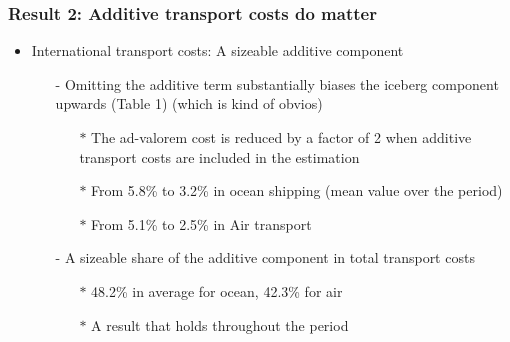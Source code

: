 \documentclass[10 pt,Helvetica, french]{beamer}
\begin{document}
\begin{frame}[label=slide_result2]
\frametitle{Result 2: Additive transport costs do matter}
\begin{itemize}
\item International transport costs: A sizeable additive component  \vspace{0.2cm}
\begin{itemize}
\item[-] Omitting the additive term substantially biases the iceberg component upwards (Table 1) (which is kind of obvios) \vspace{0.2cm}
\begin{itemize}
\item[$\ast$] The ad-valorem cost is reduced by a factor of 2 when additive transport costs are included in the estimation  \vspace{0.2cm}
\item[$\ast$] From 5.8\% to 3.2\% in ocean shipping (mean value over the period) \vspace{0.2cm}
\item[$\ast$] From 5.1\% to 2.5\% in Air transport \vspace{0.2cm}
\end{itemize}
\item[-] A sizeable share of the additive component in total transport costs \vspace{0.2cm}
\begin{itemize}
\item[$\ast$] 48.2\% in average for ocean, 42.3\% for air  \vspace{0.2cm}
\item[$\ast$] A result that holds throughout the period \hyperlink{slide_fig1}{} \vspace{0.1cm}
\end{itemize}
\end{itemize}
\end{itemize}
\end{frame}
\end{document}
